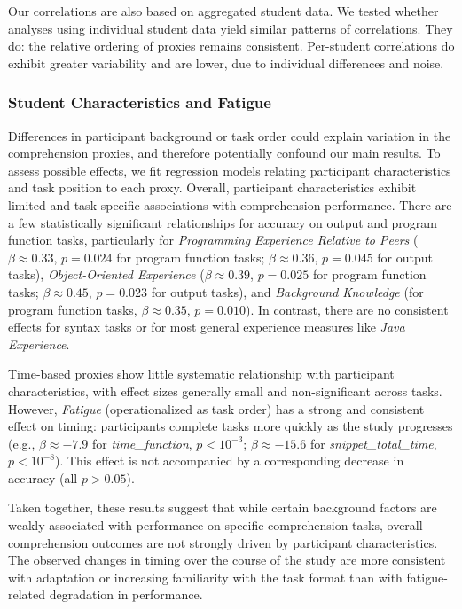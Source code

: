Our correlations are also based on aggregated student data. We tested whether analyses using individual student data yield similar patterns of correlations.
They do: the relative ordering of proxies
remains consistent. Per-student correlations do exhibit greater variability and are lower, due to individual differences and noise.



\subsubsection{Student Characteristics and Fatigue}
\label{sec:results-background}

Differences in participant background or task order could explain variation in the comprehension proxies, and therefore potentially confound our main results. To assess possible effects, we fit regression models relating participant characteristics and task position to each proxy. Overall, participant characteristics exhibit limited and task-specific associations with comprehension performance. There are a few statistically significant relationships for accuracy on output and program function tasks, particularly for \emph{Programming Experience Relative to Peers} ($\beta \approx 0.33$, $p = 0.024$ for program function tasks; $\beta \approx 0.36$, $p = 0.045$ for output tasks), \emph{Object-Oriented Experience} ($\beta \approx 0.39$, $p = 0.025$ for program function tasks; $\beta \approx 0.45$, $p = 0.023$ for output tasks), and \emph{Background Knowledge} (for program function tasks, $\beta \approx 0.35$, $p = 0.010$). In contrast, there are no consistent effects for syntax tasks or for most general experience measures like \emph{Java Experience}.


Time-based proxies show little systematic relationship with participant characteristics, with effect sizes generally small and non-significant across tasks. However, \emph{Fatigue} (operationalized as task order) has a strong and consistent effect on timing: participants complete tasks more quickly as the study progresses (e.g., $\beta \approx -7.9$ for \emph{time\_function}, $p < 10^{-3}$; $\beta \approx -15.6$ for \emph{snippet\_total\_time}, $p < 10^{-8}$). This effect is not accompanied by a corresponding decrease in accuracy (all $p > 0.05$).

Taken together, these results suggest that while certain background factors are weakly associated with performance on specific comprehension tasks, overall comprehension outcomes are not strongly driven by participant characteristics. The observed changes in timing over the course of the study are more consistent with adaptation or increasing familiarity with the task format than with fatigue-related degradation in performance.





